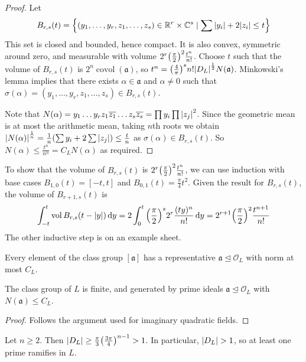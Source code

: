 \begin{proof}
    Let
    \[ B_{r,s}(t) = \qty{(y_1, \dots, y_r, z_1, \dots, z_s) \in \mathbb R^r \times \mathbb C^s \mid \sum \abs{y_i} + 2 \abs{z_i} \leq t} \]
    This set is closed and bounded, hence compact.
    It is also convex, symmetric around zero, and measurable with volume \( 2^r \qty(\frac{\pi}{2})^2 \frac{t^n}{n!} \).
    Choose \( t \) such that the volume of \( B_{r,s}(t) \) is \( 2^n \operatorname{covol}(\mathfrak a) \), so \( t^n = \qty(\frac{4}{\pi})^s n! \abs{D_L}^\frac{1}{2} N(\mathfrak a) \).
    Minkowski's lemma implies that there exists \( \alpha \in \mathfrak a \) and \( \alpha \neq 0 \) such that \( \sigma(\alpha) = (y_1, \dots, y_r, z_1, \dots, z_s) \in B_{r,s}(t) \).

    Note that \( N(\alpha) = y_1 \dots y_r z_1 \overline{z_1} \dots z_s \overline{z_s} = \prod y_i \prod \abs{z_j}^2 \).
    Since the geometric mean is at most the arithmetic mean, taking \( n \)th roots we obtain \( \abs{N(\alpha)}^{\frac{1}{n}} = \frac{1}{n}\qty(\sum y_i + 2 \sum \abs{z_j}) \leq \frac{t}{n} \) as \( \sigma(\alpha) \in B_{r,s}(t) \).
    So \( N(\alpha) \leq \frac{t^n}{n^n} = C_L N(\alpha) \) as required.
\end{proof}
To show that the volume of \( B_{r,s}(t) \) is \( 2^r \qty(\frac{\pi}{2})^2 \frac{t^n}{n!} \), we can use induction with base cases \( B_{1,0}(t) = [-t,t] \) and \( B_{0,1}(t) = \frac{\pi}{4} t^2 \).
Given the result for \( B_{r,s}(t) \), the volume of \( B_{r+1,s}(t) \) is
\[ \int_{-t}^t \operatorname{vol} B_{r,s}(t-\abs{y}) \dd{y} = 2\int_0^t \qty(\frac{\pi}{2})^s 2^r \frac{(ty)^n}{n!} \dd{y} = 2^{r+1} \qty(\frac{\pi}{2})^2 \frac{t^{n+1}}{n!} \]
The other inductive step is on an example sheet.
\begin{corollary}
    Every element of the class group \( [\mathfrak a] \) has a representative \( \mathfrak a \trianglelefteq \mathcal O_L \) with norm at most \( C_L \).
\end{corollary}
\begin{theorem}
    The class group of \( L \) is finite, and generated by prime ideals \( \mathfrak a \trianglelefteq \mathcal O_L \) with \( N(\mathfrak a) \leq C_L \).
\end{theorem}
\begin{proof}
    Follows the argument used for imaginary quadratic fields.
\end{proof}
\begin{theorem}
    Let \( n \geq 2 \).
    Then \( \abs{D_L} \geq \frac{\pi}{3} \qty(\frac{3\pi}{4})^{n-1} > 1 \).
    In particular, \( \abs{D_L} > 1 \), so at least one prime ramifies in \( L \).
\end{theorem}
